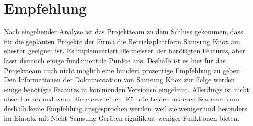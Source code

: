 \section{Empfehlung}
Nach eingehender Analyse ist das Projektteam zu dem Schluss gekommen, dass für die geplanten Projekte der Firma die Betriebsplattform Samsung Knox am ehesten geeignet ist. Es implementiert die meisten der benötigten Features, aber lässt dennoch einige fundamentale Punkte aus. Deshalb ist es hier für das Projektteam auch nicht möglich eine hundert prozentige Empfehlung zu geben. Den Informationen der Dokumentation von Samsung Knox zur Folge werden einige benötigte Features in kommenden Versionen eingebaut. Allerdings ist nicht absehbar ob und wann diese erscheinen. Für die beiden anderen Systeme kann deshalb keine Empfehlung ausgesprochen werden, weil sie weniger und besonders im Einsatz mit Nicht-Samsung-Geräten signifikant weniger Funktionen bieten.

